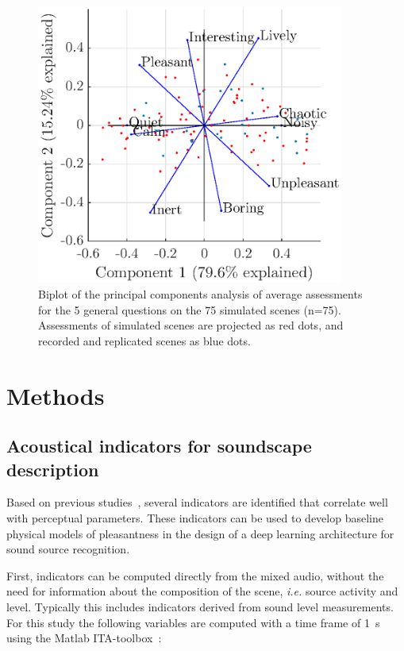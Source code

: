 \documentclass[11pt,a4paper]{article}
\begin{document}
\begin{figure}[h]
    \centering
    \includegraphics[width=0.9\textwidth]{figures/pca_sim.eps}
    \caption{Biplot of the principal components analysis of average assessments for the 5 general questions on the 75 simulated scenes (n=75). Assessments of simulated scenes are projected as red dots, and recorded and replicated scenes as blue dots.}\label{fig:pspace_sim}
\end{figure}


\section{Methods}
\label{sec:methods}

\subsection{Acoustical indicators for soundscape description}
\label{sec:methods_inds}

Based on previous studies~\cite{aumond2017, gontier2018, ricciardi2014}, several indicators are identified that correlate well with perceptual parameters. These indicators can be used to develop baseline physical models of pleasantness in the design of a deep learning architecture for sound source recognition.

First, indicators can be computed directly from the mixed audio, without the need for information about the composition of the scene, \textit{i.e.} source activity and level. Typically this includes indicators derived from sound level measurements. For this study the following variables are computed with a time frame of 1~s using the Matlab ITA-toolbox~\cite{itatoolbox2017}:
\end{document}
